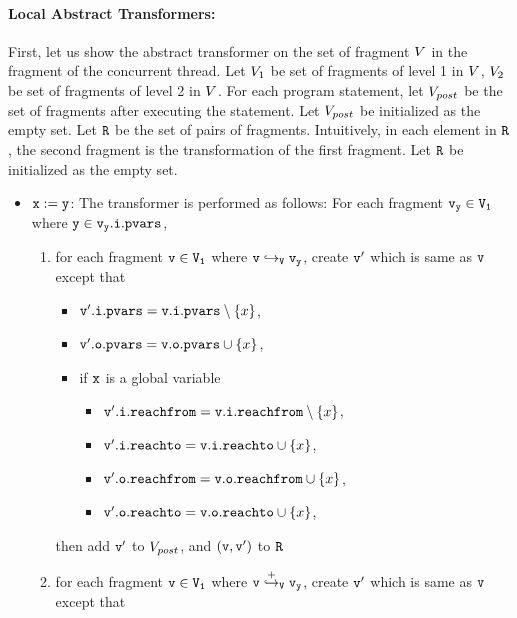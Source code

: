 \paragraph{Local Abstract Transformers:} First, let us show the abstract transformer on the set of fragment $V$ in the fragment of the concurrent thread. Let $V_1$ be set of fragments of level 1 in $V$, $V_2$ be set of fragments of level 2 in $V$. For each program statement, let $V_{post}$ be the set of fragments after executing the statement. Let $V_{post}$ be initialized as the empty set.  Let $\tt R$ be the set of pairs of fragments. Intuitively, in each element in $\tt R$, the second fragment is the transformation of the first fragment. Let $\tt R$ be initialized as the empty set.
\begin{itemize}
\item ${\tt x := y}$: The transformer is performed as follows:  For each fragment $\tt \mathtt{v}_y \in V_1$ where $\tt y \in\mathtt{v}_y.\mathtt{i}.\mathtt{pvars}$, 
\begin{enumerate}
\item  for each fragment $\tt v \in V_1$ where $\tt v \hookrightarrow_{V} \mathtt{v}_y$, create $\tt v'$ which is same as $\tt v$ except that
\begin{itemize}
\item $\mathtt{v}'.\mathtt{i}.\mathtt{pvars} = \mathtt{v}.\mathtt{i}.\mathtt{pvars} \setminus \left\{x\right\}$,
\item $\mathtt{v}'.\mathtt{o}.\mathtt{pvars} = \mathtt{v}.\mathtt{o}.\mathtt{pvars} \cup \left\{x\right\}$,
\item if $\mathtt{x}$ is a global variable
\begin{itemize}
\item $\mathtt{v}'.\mathtt{i}.\mathtt{reachfrom} = \mathtt{v}.\mathtt{i}.\mathtt{reachfrom} \setminus \left\{x\right\}$,
\item $\mathtt{v}'.\mathtt{i}.\mathtt{reachto} = \mathtt{v}.\mathtt{i}.\mathtt{reachto} \cup \left\{x\right\}$,
 \item $\mathtt{v}'.\mathtt{o}.\mathtt{reachfrom} = \mathtt{v}.\mathtt{o}.\mathtt{reachfrom} \cup \left\{x\right\}$,
\item $\mathtt{v}'.\mathtt{o}.\mathtt{reachto} = \mathtt{v}.\mathtt{o}.\mathtt{reachto} \cup \left\{x\right\}$,
\end{itemize}
\end{itemize}
then add $\tt v'$ to $V_{post}$, and $\tt (v,v')$ to $\tt R$
\item for each fragment $\tt v \in V_1$ where $\tt v \overset{+}\hookrightarrow_{V} \mathtt{v}_y$, create $\tt v'$ which is same as $\tt v$ except that

\end{enumerate}
\end{itemize}
